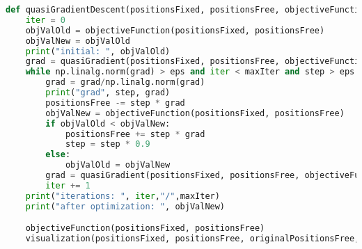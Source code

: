 \begin{lstlisting}[language=Python, style=jupycolors]
def quasiGradientDescent(positionsFixed, positionsFree, objectiveFunction, step=0.02, eps=1e-3, maxIter=1000):
    iter = 0
    objValOld = objectiveFunction(positionsFixed, positionsFree)
    objValNew = objValOld
    print("initial: ", objValOld)
    grad = quasiGradient(positionsFixed, positionsFree, objectiveFunction)
    while np.linalg.norm(grad) > eps and iter < maxIter and step > eps:
        grad = grad/np.linalg.norm(grad)
        print("grad", step, grad)
        positionsFree -= step * grad
        objValNew = objectiveFunction(positionsFixed, positionsFree) 
        if objValOld < objValNew:
            positionsFree += step * grad
            step = step * 0.9
        else:
            objValOld = objValNew
        grad = quasiGradient(positionsFixed, positionsFree, objectiveFunction)
        iter += 1
    print("iterations: ", iter,"/",maxIter)
    print("after optimization: ", objValNew)

    objectiveFunction(positionsFixed, positionsFree)
    visualization(positionsFixed, positionsFree, originalPositionsFree, True)

\end{lstlisting}
